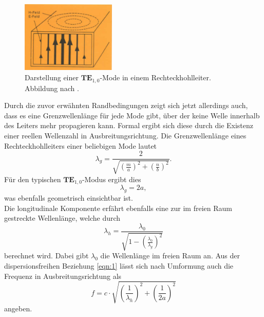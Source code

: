 \begin{figure}
    \centering
    \includegraphics[width=0.4\textwidth]{Bilder/mode.png}
    \caption{Darstellung einer $\textbf{TE}_{1,0}$-Mode in einem Rechteckhohlleiter. Abbildung nach \cite{skript}.} 
    \label{fig:4}
\end{figure}
Durch die zuvor erwähnten Randbedingungen zeigt sich jetzt allerdings auch, dass es eine Grenzwellenlänge für jede Mode gibt, über der keine Welle innerhalb des Leiters mehr propagieren kann. Formal ergibt sich diese durch die Existenz einer reellen Wellenzahl 
in Ausbreitungsrichtung. 
Die Grenzwellenlänge eines Rechteckhohlleiters einer beliebigen Mode lautet
\begin{equation*}
\lambda_{g} = \frac{2}{\sqrt{\left(\frac{m}{a}\right)^2 + \left(\frac{n}{b}\right)^2}}.
\end{equation*}
Für den typischen $\textbf{TE}_{1,0}$-Modus ergibt dies 
\begin{equation*}
    \lambda_{g} = 2a,
\end{equation*}
was ebenfalls geometrisch einsichtbar ist.
\\
Die longitudinale Komponente erfährt ebenfalls eine zur im freien Raum gestreckte Wellenlänge, welche durch
\begin{equation*}
    \lambda_{h} = \frac{\lambda_0}{\sqrt{1 - \left(\frac{\lambda_0}{\lambda_{g}}\right)^2}}
\end{equation*}
berechnet wird. Dabei gibt $\lambda_0$ die Wellenlänge im freien Raum an. Aus der dispersionsfreihen Beziehung \ref{eqn:1} lässt sich nach Umformung auch die Frequenz in Ausbreitungsrichtung als
\begin{equation}
    \label{eqn:222}
    f = c \cdot \sqrt{\left(\frac{1}{\lambda_h}\right)^2 + \left(\frac{1}{2a}\right)^2}
\end{equation}
angeben.


